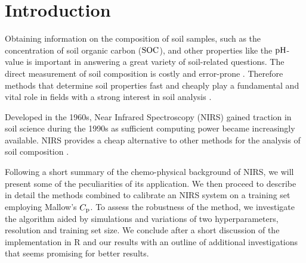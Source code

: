 \section{Introduction}
\label{sec:introduction}
	
	Obtaining information on the composition of soil samples, such as the concentration of soil organic carbon ($\mathrm{SOC}$), and other properties like the $\mathrm{pH}$-value is important in answering a great variety of soil-related questions.	
	The direct measurement of soil composition is costly and error-prone \cite[1-3]{mclaughlin:99a}.
	Therefore methods that determine soil properties fast and cheaply play a fundamental and vital role in fields with a strong interest in soil analysis \cite{ludwig:01a}.

	Developed in the 1960s, Near Infrared Spectroscopy (NIRS) gained traction in soil science during the 1990s as sufficient computing power became increasingly available.
	NIRS provides a cheap alternative to other methods for the analysis of soil composition \cite[247]{agelet:10a}.

	Following a short summary of the chemo-physical background of NIRS, we will present some of the peculiarities of its application.
	We then proceed to describe in detail the methods combined to calibrate an NIRS system on a training set employing Mallow's $C_{\mathrm{p}}$.
	To assess the robustness of the method, we investigate the algorithm aided by simulations and variations of two hyperparameters, resolution and training set size.
	We conclude after a short discussion of the implementation in \textsf{R} \cite{r-foundation:16a} and our results with an outline of additional investigations that seems promising for better results.

